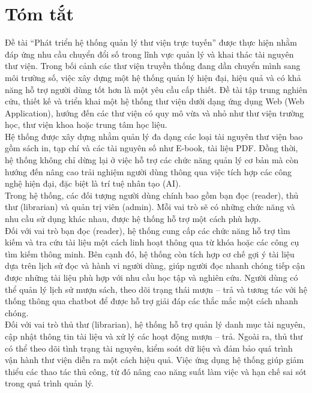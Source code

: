 \section*{Tóm tắt}
\thispagestyle{empty}

Đề tài “Phát triển hệ thống quản lý thư viện trực tuyến” được thực hiện nhằm đáp ứng nhu cầu chuyển đổi số trong lĩnh vực quản lý và khai thác tài nguyên thư viện. Trong bối cảnh các thư viện truyền thống đang dần chuyển mình sang môi trường số, việc xây dựng một hệ thống quản lý hiện đại, hiệu quả và có khả năng hỗ trợ người dùng tốt hơn là một yêu cầu cấp thiết. Đề tài tập trung nghiên cứu, thiết kế và triển khai một hệ thống thư viện dưới dạng ứng dụng Web (Web Application), hướng đến các thư viện có quy mô vừa và nhỏ như thư viện trường học, thư viện khoa hoặc trung tâm học liệu. \\

Hệ thống được xây dựng nhằm quản lý đa dạng các loại tài nguyên thư viện bao gồm sách in, tạp chí và các tài nguyên số như E-book, tài liệu PDF. Đồng thời, hệ thống không chỉ dừng lại ở việc hỗ trợ các chức năng quản lý cơ bản mà còn hướng đến nâng cao trải nghiệm người dùng thông qua việc tích hợp các công nghệ hiện đại, đặc biệt là trí tuệ nhân tạo (AI). \\

Trong hệ thống, các đối tượng người dùng chính bao gồm bạn đọc (reader), thủ thư (librarian) và quản trị viên (admin). Mỗi vai trò sẽ có những chức năng và nhu cầu sử dụng khác nhau, được hệ thống hỗ trợ một cách phù hợp.\\

Đối với vai trò bạn đọc (reader), hệ thống cung cấp các chức năng hỗ trợ tìm kiếm và tra cứu tài liệu một cách linh hoạt thông qua từ khóa hoặc các công cụ tìm kiếm thông minh. Bên cạnh đó, hệ thống còn tích hợp cơ chế gợi ý tài liệu dựa trên lịch sử đọc và hành vi người dùng, giúp người đọc nhanh chóng tiếp cận được những tài liệu phù hợp với nhu cầu học tập và nghiên cứu. Người dùng có thể quản lý lịch sử mượn sách, theo dõi trạng thái mượn – trả và tương tác với hệ thống thông qua chatbot để được hỗ trợ giải đáp các thắc mắc một cách nhanh chóng.\\

Đối với vai trò thủ thư (librarian), hệ thống hỗ trợ quản lý danh mục tài nguyên, cập nhật thông tin tài liệu và xử lý các hoạt động mượn – trả. Ngoài ra, thủ thư có thể theo dõi tình trạng tài nguyên, kiểm soát dữ liệu và đảm bảo quá trình vận hành thư viện diễn ra một cách hiệu quả. Việc ứng dụng hệ thống giúp giảm thiểu các thao tác thủ công, từ đó nâng cao năng suất làm việc và hạn chế sai sót trong quá trình quản lý.\\

